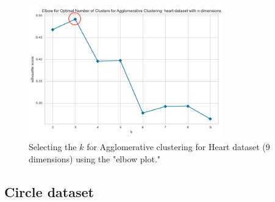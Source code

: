 \begin{figure}[H]
  \includegraphics[width=0.75\textwidth]{Appendix//parameter-selection/heart-dataset-n-agglomerative.png}
  \caption{Selecting the $k$ for Agglomerative clustering for Heart dataset (9 dimensions) using the "elbow plot."}
  \label{hyperparameters:agglomerative-heart-dataset-9d}
\end{figure}
\newpage

\subsection{Circle dataset}

